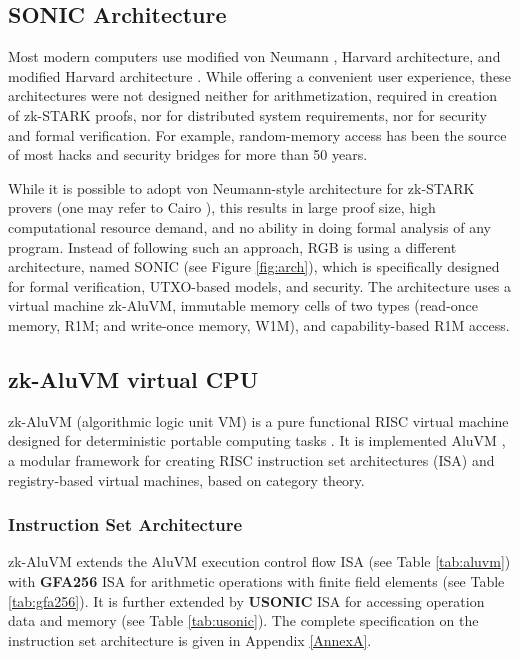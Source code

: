 \documentclass[9pt,oneside]{amsart}
\begin{document}
\begin{multicols}{2}

\section{SONIC Architecture}\label{Sonic}

Most modern computers use modified von Neumann \cite{vonNeumann},
Harvard architecture, and modified Harvard architecture \cite{Harvard}.
While offering a convenient user experience, these architectures were not designed neither for
arithmetization, required in creation of zk-STARK proofs, nor for distributed system requirements,
nor for security and formal verification.
For example, random-memory access has been the source
of most hacks and security bridges for more than 50 years.

While it is possible to adopt von Neumann-style architecture for zk-STARK provers
(one may refer to Cairo \cite{Cairo}), this results in large proof size,
high computational resource demand, and no ability in doing formal analysis of any program.
Instead of following such an approach, RGB is using a different architecture,
named SONIC (see Figure \ref{fig:arch}),
which is specifically designed for formal verification, UTXO-based models, and security.
The architecture uses a virtual machine zk-AluVM, immutable memory cells of two types
(read-once memory, R1M; and write-once memory, W1M), and capability-based R1M access.

\subsection{zk-AluVM virtual CPU}\label{AluVM}

zk-AluVM (algorithmic logic unit VM) is a pure functional RISC virtual machine
designed for deterministic portable computing tasks \cite{zkAluVM}.
It is implemented AluVM \cite{AluVM, AluVMCrate},
a modular framework for creating  RISC instruction set architectures (ISA)
and registry-based virtual machines, based on category theory.

\subsubsection{Instruction Set Architecture}

zk-AluVM extends the AluVM execution control flow ISA (see Table \ref{tab:aluvm})
with \textbf{GFA256} ISA for arithmetic operations
with finite field elements (see Table \ref{tab:gfa256}).
It is further extended by \textbf{USONIC} ISA
for accessing operation data and memory (see Table \ref{tab:usonic}).
The complete specification on the instruction set architecture is given in Appendix \ref{AnnexA}.


\end{multicols}
\end{document}
